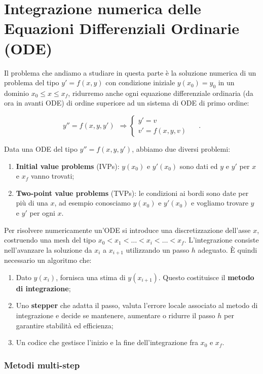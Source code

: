 \chapter{Integrazione numerica delle Equazioni Differenziali Ordinarie (ODE)}
Il problema che andiamo a studiare in questa parte è la soluzione numerica di un problema del tipo $\boxed{y'=f(x, y)}$ con condizione iniziale $y(x_0)=y_0$ in un dominio $x_0\leq x \leq x_f$, ridurremo anche ogni equazione differenziale ordinaria (da ora in avanti ODE) di ordine superiore ad un sistema di ODE di primo ordine:

\[ y''=f(x, y, y')\ \ \Rightarrow \begin{cases} y' = v \\ v' = f(x, y, v) \end{cases} \ \ \ \ \ \ .\]

Data una ODE del tipo $y''=f(x, y, y')$, abbiamo due diversi problemi:
\begin{enumerate}
	\item \textbf{Initial value problems} (IVPs): $y(x_0)$ e $y'(x_0)$ sono dati ed $y$ e $y'$ per $x$ e $x_f$ vanno trovati;
	\item \textbf{Two-point value problems} (TVPs): le condizioni ai bordi sono date per più di una $x$, ad esempio conosciamo $y(x_0)$ e $y'(x_0)$ e vogliamo trovare $y$ e $y'$ per ogni $x$.
\end{enumerate}
Per risolvere numericamente un'ODE si introduce una discretizzazione dell'asse $x$,
costruendo una mesh del tipo $x_0 < x_1 < \dots <x_i<\dots< x_f$. L'integrazione consiste
nell'avanzare la soluzione da $x_i$ a $x_{i+1}$ utilizzando un passo $h$ adeguato.
È quindi necessario un algoritmo che:

\begin{enumerate}
	\item Dato $y(x_i)$, fornisca una stima di $y(x_{i+1})$. Questo costituisce il \textbf{metodo di integrazione}; 
	\item Uno \textbf{stepper} che adatta il passo, valuta l'errore locale associato al metodo di integrazione e decide se mantenere, aumentare o ridurre il passo $h$ per garantire stabilità ed efficienza;
	\item Un codice che gestisce l'inizio e la fine dell'integrazione fra $x_0$ e $x_f$.
\end{enumerate}


%
%
\vspace{1cm}
\subsection{Metodi multi-step}

